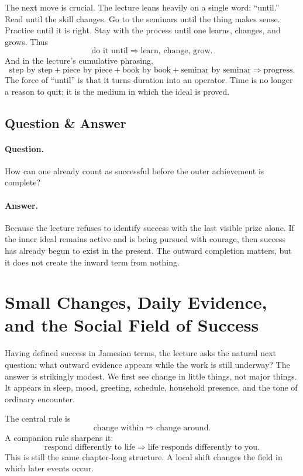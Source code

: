 The next move is crucial. The lecture leans heavily on a single word: ``until.'' Read until the skill changes. Go to the seminars until the thing makes sense. Practice until it is right. Stay with the process until one learns, changes, and grows. Thus
\begin{equation}
\text{do it until} \Rightarrow \text{learn, change, grow}.
\end{equation}
And in the lecture's cumulative phrasing,
\begin{equation}
\text{step by step}+\text{piece by piece}+\text{book by book}+\text{seminar by seminar}
\Rightarrow
\text{progress}.
\end{equation}
The force of ``until'' is that it turns duration into an operator. Time is no longer a reason to quit; it is the medium in which the ideal is proved.

\subsection{Question \& Answer}

\paragraph{Question.} How can one already count as successful before the outer achievement is complete?

\paragraph{Answer.} Because the lecture refuses to identify success with the last visible prize alone. If the inner ideal remains active and is being pursued with courage, then success has already begun to exist in the present. The outward completion matters, but it does not create the inward term from nothing.

\section{Small Changes, Daily Evidence, and the Social Field of Success}

Having defined success in Jamesian terms, the lecture asks the natural next question: what outward evidence appears while the work is still underway? The answer is strikingly modest. We first see change in little things, not major things. It appears in sleep, mood, greeting, schedule, household presence, and the tone of ordinary encounter.

The central rule is
\begin{equation}
\text{change within} \Rightarrow \text{change around}.
\end{equation}
A companion rule sharpens it:
\begin{equation}
\text{respond differently to life} \Rightarrow \text{life responds differently to you}.
\end{equation}
This is still the same chapter-long structure. A local shift changes the field in which later events occur.

